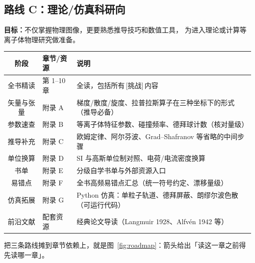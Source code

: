\documentclass[12pt,a4paper,openany,oneside]{book}
\begin{document}
\subsection*{路线 C：理论/仿真科研向}

\textbf{目标：}不仅掌握物理图像，更要熟悉推导技巧和数值工具，
为进入理论或计算等离子体物理研究做准备。

\begin{table}[htbp]
\centering
\begin{tabular}{@{}clp{6cm}@{}}
\toprule
\textbf{阶段} & \textbf{章节/资源} & \textbf{说明} \\
\midrule
全书精读 & 第 1--10 章 & 全读，包括所有\,[挑战]\,内容 \\
矢量与张量 & 附录 A & 梯度/散度/旋度、拉普拉斯算子在三种坐标下的形式（推导必备） \\
参数速查 & 附录 B & 等离子体特征参数、碰撞频率、德拜球计数（核对量级） \\
推导补充 & 附录 C & 欧姆定律、阿尔芬波、Grad--Shafranov 等省略的中间步骤 \\
单位换算 & 附录 D & SI 与高斯单位制对照、电荷/电流密度换算 \\
书单 & 附录 E & 分级自学书单与外部资源入口 \\
易错点 & 附录 F & 全书高频易错点汇总（统一符号约定、漂移量级） \\
仿真拓展 & 附录 G & Python 仿真：单粒子轨道、德拜屏蔽、朗缪尔波色散（可运行代码） \\
前沿文献 & 配套资源 & 经典论文导读（Langmuir 1928、Alfv\'{e}n 1942 等） \\
\bottomrule
\end{tabular}
\end{table}

把三条路线摊到章节依赖上，就是图~\ref{fig:roadmap}：箭头给出「读这一章之前得先读哪一章」。
\end{document}
